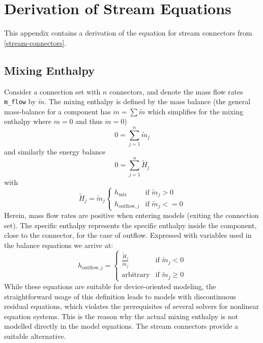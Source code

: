 \chapter{Derivation of Stream Equations}\label{derivation-of-stream-equations}

This appendix contains a derivation of the equation for stream
connectors from \cref{stream-connectors}.

\section{Mixing Enthalpy}\label{reasons-for-avoiding-the-actual-mixing-enthalpy-in-connector-definitions}\label{mixing-enthalpy}

Consider a connection set with $n$ connectors, and denote the mass flow rates \lstinline!m_flow! by $\tilde{m}$.
The mixing enthalpy is defined by the mass balance (the general mass-balance for a component has
$\dot{m}=\sum\tilde{m}$ which simplifies for the mixing enthalpy where $m=0$ and thus $\dot{m}=0$)
\begin{equation*}
0=\sum_{j=1}^n\tilde{m}_j
\end{equation*}
and similarly the energy balance
\begin{equation*}
0=\sum_{j=1}^n\tilde{H}_j
\end{equation*}
with
\begin{equation*}
\tilde{H}_j=\tilde{m}_j
\begin{cases}
h_{\mathrm{mix}}&\text{if $\tilde{m}_j>0$}\\
h_{\mathrm{outflow},j}&\text{if $\tilde{m}_j<=0$}
\end{cases}
\end{equation*}
Herein, mass flow rates are positive when entering models (exiting the
connection set). The specific enthalpy represents the specific enthalpy
inside the component, close to the connector, for the case of outflow.
Expressed with variables used in the balance equations we arrive at:
\begin{equation*}
h_{\mathrm{outflow},j}=
\begin{cases}
\frac{\tilde{H}_j}{\tilde{m}_j}&\text{if $\tilde{m}_j<0$}\\
\textrm{arbitrary}&\text{if $\tilde{m}_j \geq 0$}
\end{cases}
\end{equation*}
While these equations are suitable for device-oriented modeling, the
straightforward usage of this definition leads to models with
discontinuous residual equations, which violates the prerequisites of
several solvers for nonlinear equation systems. This is the reason why
the actual mixing enthalpy is not modelled directly in the model
equations. The stream connectors provide a suitable alternative.

